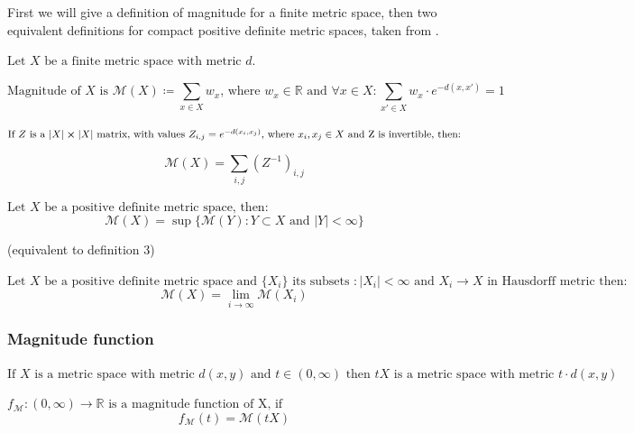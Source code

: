 \documentclass{article}
\begin{document}
First we will give a definition of magnitude for a finite metric space, then two equivalent definitions for
compact positive definite metric spaces, taken from \textcite{Leinster_2012}. 
\begin{definition}
\item 
    $\text{Let $X$ be a finite metric space with metric $d$.}$
\item
    $$\text{Magnitude of $X$ is } \mathcal{M}(X) \coloneqq \sum_{x \in X} w_x \text{, where } w_x \in \mathbb{R} \text{ and } \forall x \in X : \sum_{x' \in X} w_x \cdot e^{-d(x, x')} = 1$$
\end{definition}
\begin{remark}
\item
    $\text{If $Z$ is a $|X| \cross |X|$ matrix, with values $Z_{i, j} = e^{-d(x_i, x_j)}$, where $x_i, x_j \in X$ and Z is invertible, then:}$
\item
    $$\mathcal{M}(X) = \sum_{i, j} (Z^{-1})_{i, j} $$
\end{remark}
\begin{definition}
\item 
    $\text{Let $X$ be a positive definite metric space, then:}$
    $$\mathcal{M}(X) = \sup\{\mathcal{M}(Y) : Y \subset X \text{ and $|Y| < \infty$}\}$$
\end{definition}
\begin{definition}
    (equivalent to definition 3)
\item 
    $\text{Let $X$ be a positive definite metric space and $\{X_i\} \text{ its subsets } : |X_i| < \infty \text{ and } X_i \rightarrow X$ in Hausdorff metric then:}$ 
    $$\mathcal{M}(X) = \lim_{i \rightarrow \infty} \mathcal{M}(X_i)$$
\end{definition}
\subsubsection{Magnitude function}
\begin{definition}
    $\text{If } X \text{ is a metric space with metric $d(x, y)$ and $t \in (0, \infty)$ then } tX \text{ is a metric space with metric } t \cdot d(x, y)$
\end{definition}
\begin{definition}
    $f_{\mathcal{M}} : (0, \infty) \rightarrow \mathbb{R} \text{ is a magnitude function of X, if }$
    $$f_{\mathcal{M}}(t) = \mathcal{M}(tX)$$
\end{definition}
\end{document}
